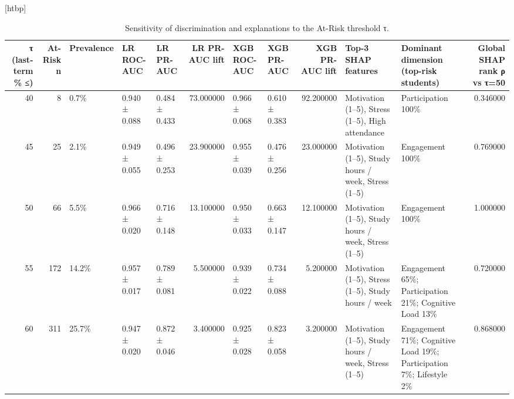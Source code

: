 \begin{table}
\small[htbp]
\caption{Sensitivity of discrimination and explanations to the At-Risk threshold τ.}
\label{tab:S26_threshold_sensitivity}
\begin{tabular}{rrlllrllrllr}
\toprule
τ (last-term \% ≤) & At-Risk n & Prevalence & LR ROC-AUC & LR PR-AUC & LR PR-AUC lift & XGB ROC-AUC & XGB PR-AUC & XGB PR-AUC lift & Top-3 SHAP features & Dominant dimension (top-risk students) & Global SHAP rank ρ vs τ=50 \\
\midrule
40 & 8 & 0.7\% & 0.940 ± 0.088 & 0.484 ± 0.433 & 73.000000 & 0.966 ± 0.068 & 0.610 ± 0.383 & 92.200000 & Motivation (1–5), Stress (1–5), High attendance & Participation 100\% & 0.346000 \\
45 & 25 & 2.1\% & 0.949 ± 0.055 & 0.496 ± 0.253 & 23.900000 & 0.955 ± 0.039 & 0.476 ± 0.256 & 23.000000 & Motivation (1–5), Study hours / week, Stress (1–5) & Engagement 100\% & 0.769000 \\
50 & 66 & 5.5\% & 0.966 ± 0.020 & 0.716 ± 0.148 & 13.100000 & 0.950 ± 0.033 & 0.663 ± 0.147 & 12.100000 & Motivation (1–5), Study hours / week, Stress (1–5) & Engagement 100\% & 1.000000 \\
55 & 172 & 14.2\% & 0.957 ± 0.017 & 0.789 ± 0.081 & 5.500000 & 0.939 ± 0.022 & 0.734 ± 0.088 & 5.200000 & Motivation (1–5), Stress (1–5), Study hours / week & Engagement 65\%; Participation 21\%; Cognitive Load 13\% & 0.720000 \\
60 & 311 & 25.7\% & 0.947 ± 0.020 & 0.872 ± 0.046 & 3.400000 & 0.925 ± 0.028 & 0.823 ± 0.058 & 3.200000 & Motivation (1–5), Study hours / week, Stress (1–5) & Engagement 71\%; Cognitive Load 19\%; Participation 7\%; Lifestyle 2\% & 0.868000 \\
\bottomrule
\end{tabular}
\end{table}
